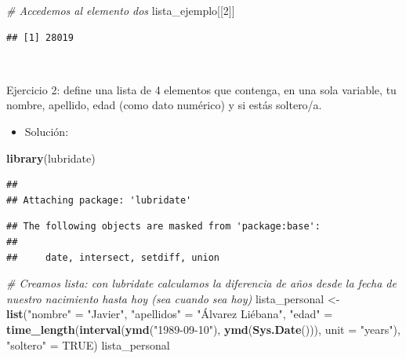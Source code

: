 \documentclass[11pt,]{book}
\newenvironment{Shaded}{\begin{snugshade}}{\end{snugshade}}
\newcommand{\CommentTok}[1]{\textcolor[rgb]{0.37,0.37,0.37}{\textit{#1}}}
\newcommand{\DataTypeTok}[1]{\textcolor[rgb]{0.27,0.27,0.27}{#1}}
\newcommand{\DecValTok}[1]{\textcolor[rgb]{0.06,0.06,0.06}{#1}}
\newcommand{\KeywordTok}[1]{\textcolor[rgb]{0.27,0.27,0.27}{\textbf{#1}}}
\newcommand{\NormalTok}[1]{#1}
\newcommand{\OtherTok}[1]{\textcolor[rgb]{0.37,0.37,0.37}{#1}}
\newcommand{\StringTok}[1]{\textcolor[rgb]{0.5,0.5,0.5}{#1}}
\providecommand{\tightlist}{%
  \setlength{\itemsep}{0pt}\setlength{\parskip}{0pt}}
\begin{document}
\begin{Shaded}
\begin{Highlighting}[]
\CommentTok{# Accedemos al elemento dos}
\NormalTok{lista_ejemplo[[}\DecValTok{2}\NormalTok{]]}
\end{Highlighting}
\end{Shaded}

\begin{verbatim}
## [1] 28019
\end{verbatim}

~

Ejercicio 2: define una lista de 4 elementos que contenga, en una sola variable, tu nombre, apellido, edad (como dato numérico) y si estás soltero/a.

\begin{itemize}
\tightlist
\item
  Solución:
\end{itemize}

\begin{Shaded}
\begin{Highlighting}[]
\KeywordTok{library}\NormalTok{(lubridate)}
\end{Highlighting}
\end{Shaded}

\begin{verbatim}
## 
## Attaching package: 'lubridate'
\end{verbatim}

\begin{verbatim}
## The following objects are masked from 'package:base':
## 
##     date, intersect, setdiff, union
\end{verbatim}

\begin{Shaded}
\begin{Highlighting}[]
\CommentTok{# Creamos lista: con lubridate calculamos la diferencia de años desde la fecha de nuestro nacimiento hasta hoy (sea cuando sea hoy)}
\NormalTok{lista_personal <-}\StringTok{ }\KeywordTok{list}\NormalTok{(}\StringTok{"nombre"}\NormalTok{ =}\StringTok{ "Javier"}\NormalTok{,}
                       \StringTok{"apellidos"}\NormalTok{ =}\StringTok{ "Álvarez Liébana"}\NormalTok{,}
                       \StringTok{"edad"}\NormalTok{ =}\StringTok{ }\KeywordTok{time_length}\NormalTok{(}\KeywordTok{interval}\NormalTok{(}\KeywordTok{ymd}\NormalTok{(}\StringTok{"1989-09-10"}\NormalTok{), }\KeywordTok{ymd}\NormalTok{(}\KeywordTok{Sys.Date}\NormalTok{())), }\DataTypeTok{unit =} \StringTok{"years"}\NormalTok{),}
                       \StringTok{"soltero"}\NormalTok{ =}\StringTok{ }\OtherTok{TRUE}\NormalTok{)}
\NormalTok{lista_personal}
\end{Highlighting}
\end{Shaded}
\end{document}
